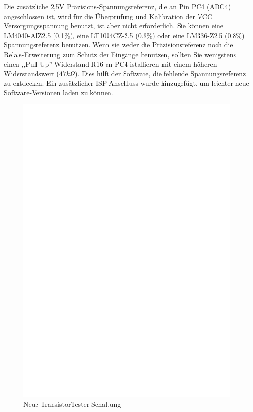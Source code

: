 Die zusätzliche 2,5V Präzisions-Spannungsreferenz, die an Pin PC4 (ADC4) angeschlossen ist,
wird für die Überprüfung und Kalibration der VCC Versorgungsspannung benutzt, ist aber nicht
erforderlich.
Sie können eine LM4040-AIZ2.5 (0.1\%),
eine LT1004CZ-2.5 (0.8\%) oder eine LM336-Z2.5 (0.8\%) Spannungsreferenz benutzen.
Wenn sie weder die Präzisionsreferenz noch die Relais-Erweiterung zum Schutz der Eingänge benutzen,
sollten Sie wenigstens einen ,,Pull Up'' Widerstand R16 an PC4 istallieren mit einem
höheren Widerstandswert (\(47k\Omega\)).
Dies hilft der Software, die fehlende Spannungsreferenz zu entdecken.
Ein zusätzlicher ISP-Anschluss wurde hinzugefügt, um leichter neue Software-Versionen
laden zu können.

\begin{figure}[H]
\centering
\includegraphics[width=18cm]{../FIG/ttester.eps}
\caption{Neue TransistorTester-Schaltung}
\label{fig:ttester}
\end{figure}

